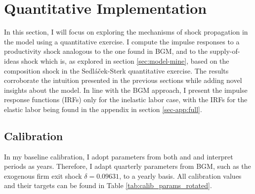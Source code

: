 \documentclass[a4paper,12pt]{article} %
\numberwithin{equation}{section} %
\numberwithin{figure}{section}
\numberwithin{table}{section}
\begin{document}
\section{Quantitative Implementation}
\label{sec:quant}

In this section, I will focus on exploring the mechanisms of shock propagation in the model using a quantitative exercise.
I compute the impulse responses to a productivity shock analogous to the one found in BGM, and to the supply-of-ideas shock which is,
as explored in section \ref{sec:model-mine}, based on the composition shock in the Sedláček-Sterk quantitative exercise. 
The results corroborate the intuition presented in the previous sections while adding novel insights about the model. In line with the 
BGM approach, I present the impulse response functions (IRFs) only for the inelastic labor case, with the IRFs for the elastic labor
being found in the appendix in section \ref{sec-app:full}.

\subsection{Calibration}
\label{sec:quant-cal} 

In my baseline calibration, I adopt parameters from both \textcite{bilbiie2012endogenous} and \textcite{sedlavcek2017growth} and
interpret periods as years. Therefore, I adapt quarterly parameters from BGM, such as the exogenous firm exit shock $\delta = 0.09631$, 
to a yearly basis. All calibration values and their targets can be found in Table \ref{tab:calib_params_rotated}.
\end{document}
